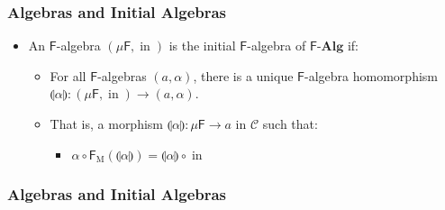 \documentclass{beamer}
\DeclareMathOperator{\obj}{O}
\DeclareMathOperator{\mor}{M}
\newcommand{\comp}{\ensuremath{\mathrel{\circ}}}
\newcommand{\cat}[1]{\ensuremath{\mathcal{#1}}}
\newcommand{\catbf}[1]{\ensuremath{\mathbf{#1}}\xspace}
\newcommand{\alg}{\catbf{Alg}}
\newcommand{\func}[1]{\ensuremath{\mathsf{#1}}}
\newcommand{\funcO}[1]{\ensuremath{\func{#1}_{\obj}}}
\newcommand{\funcM}[1]{\ensuremath{\func{#1}_{\mor}}}
\DeclareMathOperator{\inmo}{in}
\newcommand{\cata}[1]{\ensuremath{\llparenthesis#1\rrparenthesis}}
\begin{document}
\begin{frame}
  \frametitle{Algebras and Initial Algebras}

  \begin{definition}
    \begin{itemize}
    \item
      An \func{F}-algebra $(\mu\func{F},\inmo)$ is the initial
      \func{F}-algebra of \func{F}-\alg if:
      \begin{itemize}
      \item
        For all \func{F}-algebras $(a,\alpha)$, there is a unique
        \func{F}-algebra homomorphism $\cata\alpha:
        (\mu\func{F},\inmo) \to (a,\alpha)$.
      \end{itemize}
      \begin{itemize}
      \item
        That is, a morphism $\cata\alpha: \mu\func{F} \to a$ in
        $\cat{C}$ such that:
        \begin{itemize}
        \item
          $\alpha \comp \funcM{F}(\cata\alpha) = \cata\alpha \comp
          \inmo$
        \end{itemize}
      \end{itemize}
    \end{itemize}
  \end{definition}

\end{frame}


\begin{frame}
  \frametitle{Algebras and Initial Algebras}

  \begin{definition}
  \end{definition}
  \begin{center}
  \end{center}

\end{frame}
\end{document}
